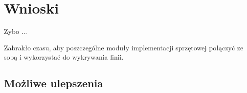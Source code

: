 \section{Wnioski}

Zybo ...

Zabrakło czasu, aby poszczególne moduły implementacji sprzętowej połączyć ze sobą i wykorzystać do wykrywania linii.

\subsection{Możliwe ulepszenia}

